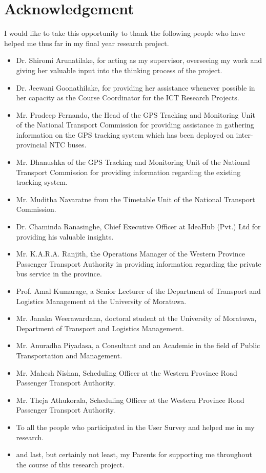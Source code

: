 \documentclass[12pt, oneside]{report}
\begin{document}
\newpage


\section*{Acknowledgement}
I would like to take this opportunity to thank the following people who have helped me thus far in my final year research project.
\begin{itemize}
\item Dr. Shiromi Arunatilake, for acting as my supervisor, overseeing my work and giving her valuable input into the thinking process of the project.
\item Dr. Jeewani Goonathilake, for providing her assistance whenever possible in her capacity as the Course Coordinator for the ICT Research Projects.
\item Mr. Pradeep Fernando, the Head of the GPS Tracking and Monitoring Unit of the National Transport Commission for providing assistance in gathering information on the GPS tracking system which has been deployed on inter-provincial NTC buses.
\item Mr. Dhanushka of the GPS Tracking and Monitoring Unit of the National Transport Commission for providing information regarding the existing tracking system.
\item Mr. Muditha Navaratne from the Timetable Unit of the National Transport Commission.
\item Dr. Chaminda Ranasinghe, Chief Executive Officer at IdeaHub (Pvt.) Ltd for providing his valuable insights.
\item Mr. K.A.R.A. Ranjith, the Operations Manager of the Western Province Passenger Transport Authority in providing information regarding the private bus service in the province.
\item Prof. Amal Kumarage, a Senior Lecturer of the Department of Transport and Logistics Management at the University of Moratuwa.
\item Mr. Janaka Weerawardana, doctoral student at the University of Moratuwa, Department of Transport and Logistics Management.
\item Mr. Anuradha Piyadasa, a Consultant and an Academic in the field of Public Transportation and Management.
\item Mr. Mahesh Nishan, Scheduling Officer at the Western Province Road Passenger Transport Authority.
\item Mr. Theja Athukorala, Scheduling Officer at the Western Province Road Passenger Transport Authority.
\item To all the people who participated in the User Survey and helped me in my research.
\item and last, but certainly not least, my Parents for supporting me throughout the course of this research project.
\end{itemize}
\end{document}
